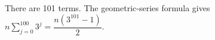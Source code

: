 There are 101 terms. The geometric-series formula gives $n\sum_{j=0}^{100}3^j=\boxed{\dfrac{n(3^{101}-1)}{2}}$.
